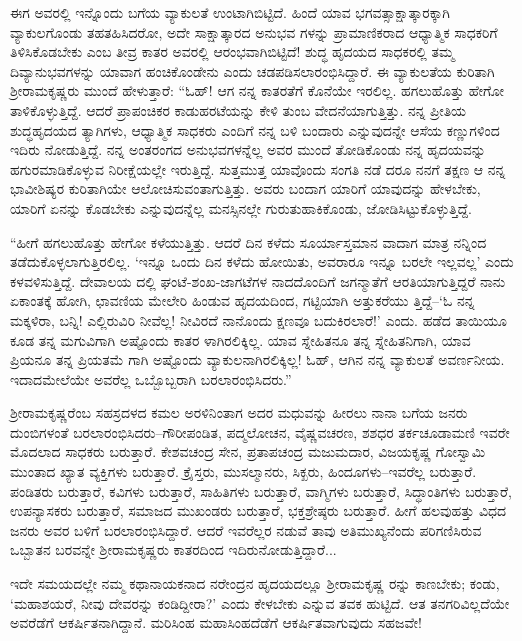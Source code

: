ಈಗ ಅವರಲ್ಲಿ ಇನ್ನೊಂದು ಬಗೆಯ ವ್ಯಾಕುಲತೆ ಉಂಟಾಗಿಬಿಟ್ಟಿದೆ. ಹಿಂದೆ ಯಾವ ಭಗವತ್ಸಾಕ್ಷಾತ್ಕಾರಕ್ಕಾಗಿ ವ್ಯಾಕುಲಗೊಂಡು ತಹತಹಿಸಿದರೋ, ಅದೇ ಸಾಕ್ಷಾತ್ಕಾರದ ಅನುಭವ ಗಳನ್ನು ಪ್ರಾಮಾಣಿಕರಾದ ಆಧ್ಯಾತ್ಮಿಕ ಸಾಧಕರಿಗೆ ತಿಳಿಸಿಕೊಡಬೇಕು ಎಂಬ ತೀವ್ರ ಕಾತರ ಅವರಲ್ಲಿ ಆರಂಭವಾಗಿಬಿಟ್ಟಿದೆ! ಶುದ್ಧ ಹೃದಯದ ಸಾಧಕರಲ್ಲಿ ತಮ್ಮ ದಿವ್ಯಾನುಭವಗಳನ್ನು ಯಾವಾಗ ಹಂಚಿಕೊಂಡೇನು ಎಂದು ಚಡಪಡಿಸಲಾರಂಭಿಸಿದ್ದಾರೆ. ಈ ವ್ಯಾಕುಲತೆಯ ಕುರಿತಾಗಿ ಶ್ರೀರಾಮಕೃಷ್ಣರು ಮುಂದೆ ಹೇಳುತ್ತಾರೆ: “ಓಹ್! ಆಗ ನನ್ನ ಕಾತರತೆಗೆ ಕೊನೆಯೇ ಇರಲಿಲ್ಲ. ಹಗಲುಹೊತ್ತು ಹೇಗೋ ತಾಳಿಕೊಳ್ಳುತ್ತಿದ್ದೆ. ಆದರೆ ಪ್ರಾಪಂಚಿಕರ ಕಾಡುಹರಟೆಯನ್ನು ಕೇಳಿ ತುಂಬ ವೇದನೆಯಾಗುತ್ತಿತ್ತು. ನನ್ನ ಪ್ರೀತಿಯ ಶುದ್ಧಹೃದಯದ ತ್ಯಾಗಿಗಳು, ಆಧ್ಯಾತ್ಮಿಕ ಸಾಧಕರು ಎಂದಿಗೆ ನನ್ನ ಬಳಿ ಬಂದಾರು ಎನ್ನುವುದನ್ನೇ ಆಸೆಯ ಕಣ್ಣುಗಳಿಂದ ಇದಿರು ನೋಡುತ್ತಿದ್ದೆ. ನನ್ನ ಅಂತರಂಗದ ಅನುಭವಗಳನ್ನೆಲ್ಲ ಅವರ ಮುಂದೆ ತೋಡಿಕೊಂಡು ನನ್ನ ಹೃದಯವನ್ನು ಹಗುರಮಾಡಿಕೊಳ್ಳುವ ನಿರೀಕ್ಷೆಯಲ್ಲೇ ಇರುತ್ತಿದ್ದೆ. ಸುತ್ತಮುತ್ತ ಯಾವೊಂದು ಸಂಗತಿ ನಡೆ ದರೂ ನನಗೆ ತಕ್ಷಣ ಆ ನನ್ನ ಭಾವೀಶಿಷ್ಯರ ಕುರಿತಾಗಿಯೇ ಆಲೋಚಿಸುವಂತಾಗುತ್ತಿತ್ತು. ಅವರು ಬಂದಾಗ ಯಾರಿಗೆ ಯಾವುದನ್ನು ಹೇಳಬೇಕು, ಯಾರಿಗೆ ಏನನ್ನು ಕೊಡಬೇಕು ಎನ್ನುವುದನ್ನೆಲ್ಲ ಮನಸ್ಸಿನಲ್ಲೇ ಗುರುತುಹಾಕಿಕೊಂಡು, ಜೋಡಿಸಿಟ್ಟುಕೊಳ್ಳುತ್ತಿದ್ದೆ.

“ಹೀಗೆ ಹಗಲುಹೊತ್ತು ಹೇಗೋ ಕಳೆಯುತ್ತಿತ್ತು. ಆದರೆ ದಿನ ಕಳೆದು ಸೂರ್ಯಾಸ್ತಮಾನ ವಾದಾಗ ಮಾತ್ರ ನನ್ನಿಂದ ತಡೆದುಕೊಳ್ಳಲಾಗುತ್ತಿರಲಿಲ್ಲ. ‘ಇನ್ನೂ ಒಂದು ದಿನ ಕಳೆದು ಹೋಯಿತು, ಅವರಾರೂ ಇನ್ನೂ ಬರಲೇ ಇಲ್ಲವಲ್ಲ’ ಎಂದು ಕಳವಳಿಸುತ್ತಿದ್ದೆ. ದೇವಾಲಯ ದಲ್ಲಿ ಘಂಟೆ-ಶಂಖ-ಜಾಗಟೆಗಳ ನಾದದೊಂದಿಗೆ ಜಗನ್ಮಾತೆಗೆ ಆರತಿಯಾಗುತ್ತಿದ್ದರೆ ನಾನು ಏಕಾಂತಕ್ಕೆ ಹೋಗಿ, ಛಾವಣಿಯ ಮೇಲೇರಿ ಹಿಂಡುವ ಹೃದಯದಿಂದ, ಗಟ್ಟಿಯಾಗಿ ಅತ್ತುಕರೆಯು ತ್ತಿದ್ದೆ–‘ಓ ನನ್ನ ಮಕ್ಕಳಿರಾ, ಬನ್ನಿ! ಎಲ್ಲಿರುವಿರಿ ನೀವೆಲ್ಲ! ನೀವಿರದೆ ನಾನೊಂದು ಕ್ಷಣವೂ ಬದುಕಿರಲಾರೆ!’ ಎಂದು. ಹಡೆದ ತಾಯಿಯೂ ಕೂಡ ತನ್ನ ಮಗುವಿಗಾಗಿ ಅಷ್ಟೊಂದು ಕಾತರ ಳಾಗಿರಲಿಕ್ಕಿಲ್ಲ. ಯಾವ ಸ್ನೇಹಿತನೂ ತನ್ನ ಸ್ನೇಹಿತನಿಗಾಗಿ, ಯಾವ ಪ್ರಿಯನೂ ತನ್ನ ಪ್ರಿಯತಮೆ ಗಾಗಿ ಅಷ್ಟೊಂದು ವ್ಯಾಕುಲನಾಗಿರಲಿಕ್ಕಿಲ್ಲ! ಓಹ್, ಆಗಿನ ನನ್ನ ವ್ಯಾಕುಲತೆ ಅವರ್ಣನೀಯ. ಇದಾದಮೇಲೆಯೇ ಅವರೆಲ್ಲ ಒಬ್ಬೊಬ್ಬರಾಗಿ ಬರಲಾರಂಭಿಸಿದರು.”

ಶ್ರೀರಾಮಕೃಷ್ಣರೆಂಬ ಸಹಸ್ರದಳದ ಕಮಲ ಅರಳಿನಿಂತಾಗ ಅದರ ಮಧುವನ್ನು ಹೀರಲು ನಾನಾ ಬಗೆಯ ಜನರು ದುಂಬಿಗಳಂತೆ ಬರಲಾರಂಭಿಸಿದರು–ಗೌರೀಪಂಡಿತ, ಪದ್ಮಲೋಚನ, ವೈಷ್ಣವಚರಣ, ಶಶಧರ ತರ್ಕಚೂಡಾಮಣಿ ಇವರೇ ಮೊದಲಾದ ಸಾಧಕರು ಬರುತ್ತಾರೆ. ಕೇಶವಚಂದ್ರ ಸೇನ, ಪ್ರತಾಪಚಂದ್ರ ಮಜುಮದಾರ, ವಿಜಯಕೃಷ್ಣ ಗೋಸ್ವಾಮಿ ಮುಂತಾದ ಖ್ಯಾತ ವ್ಯಕ್ತಿಗಳು ಬರುತ್ತಾರೆ. ಕ್ರೈಸ್ತರು, ಮುಸಲ್ಮಾನರು, ಸಿಕ್ಖರು, ಹಿಂದೂಗಳು–ಇವರೆಲ್ಲ ಬರುತ್ತಾರೆ. ಪಂಡಿತರು ಬರುತ್ತಾರೆ, ಕವಿಗಳು ಬರುತ್ತಾರೆ, ಸಾಹಿತಿಗಳು ಬರುತ್ತಾರೆ, ವಾಗ್ಮಿಗಳು ಬರುತ್ತಾರೆ, ಸಿದ್ಧಾಂತಿಗಳು ಬರುತ್ತಾರೆ, ಉಪನ್ಯಾಸಕರು ಬರುತ್ತಾರೆ, ಸಮಾಜದ ಮುಖಂಡರು ಬರುತ್ತಾರೆ, ಭಕ್ತಶ್ರೇಷ್ಠರು ಬರುತ್ತಾರೆ. ಹೀಗೆ ಹಲವುಹತ್ತು ವಿಧದ ಜನರು ಅವರ ಬಳಿಗೆ ಬರಲಾರಂಭಿಸಿದ್ದಾರೆ. ಆದರೆ ಇವರೆಲ್ಲರ ನಡುವೆ ತಾವು ಅತಿಮುಖ್ಯನೆಂದು ಪರಿಗಣಿಸಿರುವ ಒಬ್ಬಾತನ ಬರವನ್ನೇ ಶ್ರೀರಾಮಕೃಷ್ಣರು ಕಾತರದಿಂದ ಇದಿರುನೋಡುತ್ತಿದ್ದಾರೆ... 

ಇದೇ ಸಮಯದಲ್ಲೇ ನಮ್ಮ ಕಥಾನಾಯಕನಾದ ನರೇಂದ್ರನ ಹೃದಯದಲ್ಲೂ ಶ್ರೀರಾಮಕೃಷ್ಣ ರನ್ನು ಕಾಣಬೇಕು; ಕಂಡು, ‘ಮಹಾಶಯರೆ, ನೀವು ದೇವರನ್ನು ಕಂಡಿದ್ದೀರಾ?’ ಎಂದು ಕೇಳಬೇಕು ಎನ್ನುವ ತವಕ ಹುಟ್ಟಿದೆ. ಆತ ತನಗರಿವಿಲ್ಲದೆಯೇ ಅವರೆಡೆಗೆ ಆಕರ್ಷಿತನಾಗಿದ್ದಾನೆ. ಮರಿಸಿಂಹ ಮಹಾಸಿಂಹದೆಡೆಗೆ ಆಕರ್ಷಿತವಾಗುವುದು ಸಹಜವೇ!

